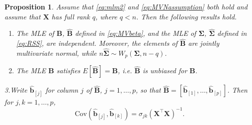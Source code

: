 \documentclass[]{book}
\newtheorem{proposition}{Proposition}[chapter]
\theoremstyle{definition}
\theoremstyle{definition}
\theoremstyle{definition}
\theoremstyle{remark}
\begin{document}
\begin{proposition}
\protect\hypertarget{prp:eight3}{}{\label{prp:eight3} }Assume that \eqref{eq:mlm2} and \eqref{eq:MVNassumption} both hold and assume that \(\boldsymbol X\) has full rank \(q\), where \(q < n\). Then the following results hold.

\begin{enumerate}
\def\labelenumi{\arabic{enumi}.}
\item
  The MLE of \(\boldsymbol B\), \(\hat{\boldsymbol B}\) defined in \eqref{eq:MVbeta}, and the MLE of \(\boldsymbol \Sigma\), \(\hat{\boldsymbol \Sigma}\) defined in \eqref{eq:RSS},
  are independent. Moreover, the elements of \(\hat{\boldsymbol B}\) are jointly multivariate normal, while \(n\hat{\boldsymbol \Sigma} \sim W_p(\boldsymbol \Sigma, n-q)\).
\item
  The MLE \(\hat{\boldsymbol B}\) satisfies \(E[\hat{\boldsymbol B}]=\boldsymbol B\), i.e. \(\hat{\boldsymbol B}\) is unbiased for \(\boldsymbol B\).
\end{enumerate}

3.Write \(\hat{\boldsymbol b}_{[j]}\) for column \(j\) of \(\hat{\boldsymbol B}\), \(j=1, \ldots , p\), so that \(\hat{\boldsymbol B}=[\hat{\boldsymbol b}_{[1]}, \ldots , \hat{\boldsymbol b}_{[p]}]\).
Then for \(j,k=1, \ldots , p\),
\[
\text{Cov}(\hat{\boldsymbol b}_{[j]}, \hat{\boldsymbol b}_{[k]})=\sigma_{jk} (\boldsymbol X^\top \boldsymbol X)^{-1}.
\]
\end{proposition}
\end{document}
